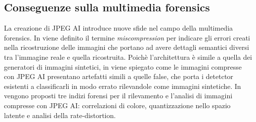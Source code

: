 \subsection{Conseguenze sulla multimedia forensics}
La creazione di JPEG AI introduce nuove sfide nel campo della multimedia forensics. In \cite{hofer2024taxonomy} viene definito il termine \textit{miscompression} per indicare gli errori creati nella ricostruzione delle immagini che portano ad avere dettagli semantici diversi tra l'immagine reale e quella ricostruita.
Poichè l'architettura è simile a quella dei generatori di immagini sintetici, in \cite{cannas2024jpeg} viene spiegato come le immagini compresse con JPEG AI presentano artefatti simili a quelle false, che porta i detetctor esistenti a classificarli in modo errato rilevandole come immagini sintetiche.
In \cite{bergmann2025three} vengono proposti tre indizi forensi per il rilevamento e l'analisi di immagini compresse con JPEG AI: correlazioni di colore, quantizzazione nello spazio latente e analisi della rate-distortion.


